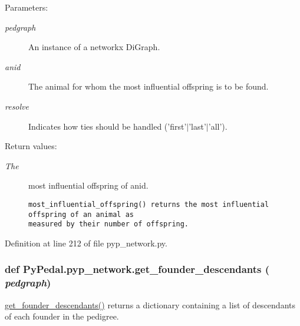 \begin{Desc}
\item[Parameters:]
\begin{description}
\item[{\em pedgraph}]An instance of a networkx Di\-Graph. \item[{\em anid}]The animal for whom the most influential offspring is to be found. \item[{\em resolve}]Indicates how ties should be handled ('first'$|$'last'$|$'all'). \end{description}
\end{Desc}
\begin{Desc}
\item[Return values:]
\begin{description}
\item[{\em The}]most influential offspring of anid.

\footnotesize\begin{verbatim}most_influential_offspring() returns the most influential offspring of an animal as
measured by their number of offspring.
\end{verbatim}
\normalsize
 \end{description}
\end{Desc}


Definition at line 212 of file pyp\_\-network.py.\hypertarget{namespacePyPedal_1_1pyp__network_6fce4d0fb5654715bf9cb3ff3dd9f38f}{
\subsubsection[get\_\-founder\_\-descendants]{\setlength{\rightskip}{0pt plus 5cm}def Py\-Pedal.pyp\_\-network.get\_\-founder\_\-descendants ( {\em pedgraph})}}
\label{namespacePyPedal_1_1pyp__network_6fce4d0fb5654715bf9cb3ff3dd9f38f}


\hyperlink{namespacePyPedal_1_1pyp__network_6fce4d0fb5654715bf9cb3ff3dd9f38f}{get\_\-founder\_\-descendants()} returns a dictionary containing a list of descendants of each founder in the pedigree. 

